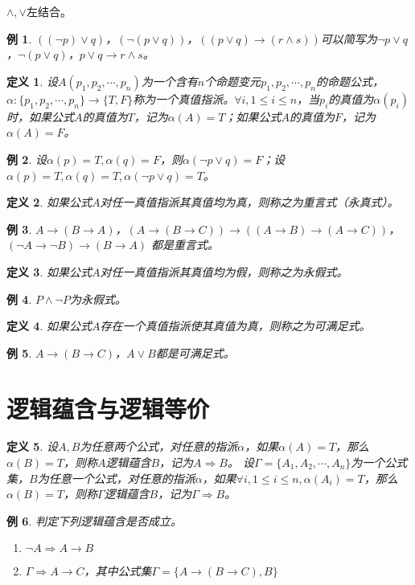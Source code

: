 \documentclass{article}
\newtheorem{Def}{定义}
\newtheorem*{Example}{例}
\begin{document}
\begin{CJK}{UTF8}{gbsn}
$\land, \lor$左结合。
\begin{Example}
  $((\lnot p)\lor q)$，$(\lnot (p\lor q))$，$((p\lor q)\to (r\land s))$可以简写为$\lnot p\lor q$，$\lnot (p\lor q)$，$p\lor q\to r\land s$。
\end{Example}
  \begin{Def}
    设$A(p_1,p_2,\cdots,p_n)$为一个含有$n$个命题变元$p_1,p_2,\cdots, p_n$的命题公式，$\alpha:\{p_1,p_2,\cdots, p_n\}\to \{T,F\}$称为一个真值指派。$\forall i, 1\leq i \leq n$，当$p_i$的真值为$\alpha(p_i)$时，如果公式$A$的真值为$T$，记为$\alpha(A)=T$；如果公式$A$的真值为$F$，记为$\alpha(A)=F$。
  \end{Def}
\begin{Example}
  设$\alpha(p)=T,\alpha(q)=F$，则$\alpha(\lnot p \lor q)=F$；设$\alpha(p)=T, \alpha(q)=T, \alpha(\lnot p \lor q)=T$。
\end{Example}
  \begin{Def}
    如果公式$A$对任一真值指派其真值均为真，则称之为重言式（永真式）。
  \end{Def}
  \begin{Example}
    $A\to(B\to A)$，$(A\to(B\to C))\to((A\to B)\to (A\to C))$，$(\lnot A\to \lnot B)\to (B \to A)$
都是重言式。
  \end{Example}
  \begin{Def}
    如果公式$A$对任一真值指派其真值均为假，则称之为永假式。
  \end{Def}
  \begin{Example}
    $P\land \lnot P$为永假式。
  \end{Example}
  \begin{Def}
    如果公式$A$存在一个真值指派使其真值为真，则称之为可满足式。
  \end{Def}
  \begin{Example}
    $A\to (B\to C)$，$A\lor B$都是可满足式。
  \end{Example}
\section{逻辑蕴含与逻辑等价}
\begin{Def}
设$A,B$为任意两个公式，对任意的指派$\alpha$，如果$\alpha(A)=T$，那么$\alpha(B)=T$，则称$A$逻辑蕴含$B$，记为$A\Rightarrow B$。
设$\Gamma=\{A_1,A_2,\cdots,A_n\}$为一个公式集，$B$为任意一个公式，对任意的指派$\alpha$，如果$\forall i, 1\leq i \leq n, \alpha(A_i)=T$，那么$\alpha(B)=T$，则称$\Gamma$逻辑蕴含$B$，记为$\Gamma \Rightarrow B$。
\end{Def}
\begin{Example}
  判定下列逻辑蕴含是否成立。
  \begin{enumerate}
    \item $\lnot A\Rightarrow A\to B$
    \item $\Gamma \Rightarrow A\to C$，其中公式集$\Gamma=\{A\to (B\to C), B\}$
  \end{enumerate}
 

\end{Example}
\end{CJK}
\end{document}
